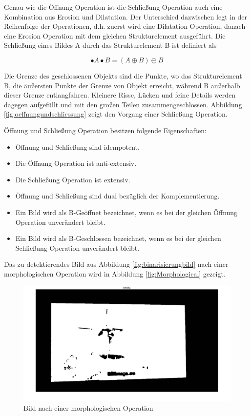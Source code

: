 Genau wie die Öffnung Operation ist die Schließung Operation auch eine Kombination aus Erosion und Dilatation. Der Unterschied dazwischen legt in der Reihenfolge der Operationen, d.h. zuerst wird eine Dilatation Operation, danach eine Erosion Operation mit dem gleichen Strukturelement ausgeführt. Die Schließung eines Bildes A durch das Strukturelement B ist definiert als

\begin{equation}
•A \bullet B =( A \oplus B )\ominus B  
\end{equation}

Die Grenze des geschlossenen Objekts sind die Punkte, wo das Strukturelement B, die äußersten Punkte der Grenze von Objekt erreicht, während B außerhalb dieser Grenze entlangfahren. Kleinere Risse, Lücken und feine Details werden dagegen aufgefüllt und mit den großen Teilen zusammengeschlossen. Abbildung \ref{fig:oeffnungundschliessung} zeigt den Vorgang einer Schließung Operation.


Öffnung und Schließung Operation besitzen folgende Eigenschaften:

\begin{itemize}

\item Öffnung und Schließung sind idempotent.
\item Die Öffnung Operation ist anti-extensiv. 
\item Die Schließung Operation ist extensiv.
\item Öffnung und Schließung sind dual bezüglich der Komplementierung.
\item Ein Bild wird als B-Geöffnet bezeichnet, wenn es bei der gleichen Öffnung Operation unverändert bleibt. 
\item Ein Bild wird als B-Geschlossen bezeichnet, wenn es bei der gleichen Schließung Operation unverändert bleibt. 

\end{itemize}

Das zu detektierendes Bild aus Abbildung \ref{fig:binarisierungbild} nach einer morphologischen Operation wird in Abbildung \ref{fig:Morphological} gezeigt.

\begin{figure}[htb]
 \centering 
  \includegraphics[keepaspectratio,width=1.0\textwidth]{images/4_ZweiteErfahrung/Morphological/morpho.pdf}
 \caption{Bild nach einer morphologischen Operation}
 \label{fig:Bild nach einer morphologischen Operation}
\end{figure} 

